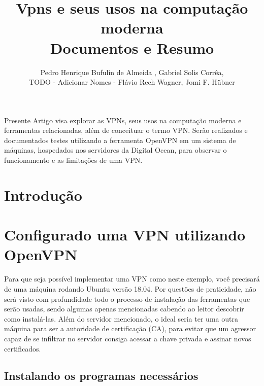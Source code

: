 \documentclass[12pt]{article}
\title{Vpns e seus usos na computação moderna\\ Documentos e Resumo}
\author{Pedro Henrique Bufulin de Almeida \inst{1}, Gabriel Solis Corrêa\inst{2},\\ TODO - Adicionar Nomes - Flávio Rech
  Wagner\inst{1}, Jomi F. Hübner\inst{3} }
\begin{document}
 

\maketitle
     
\begin{resumo} 
  Presente Artigo visa explorar as VPNs, seus usos na computação moderna
  e ferramentas relacionadas, além de conceituar o termo VPN. Serão realizados
  e documentados testes utilizando a ferramenta OpenVPN em um sistema de máquinas,
  hospedados nos servidores da Digital Ocean, para observar o funcionamento e as
  limitações de uma VPN.
\end{resumo}

\section{Introdução}



\section{Configurado uma VPN utilizando OpenVPN}

Para que seja possível implementar uma VPN como neste exemplo, você precisará
de uma máquina rodando Ubuntu versão 18.04. Por questões de praticidade, não será
visto com profundidade todo o processo de instalação das ferramentas que serão usadas, sendo algumas 
apenas mencionadas cabendo ao leitor descobrir como instalá-las. Além do servidor mencionado,
o ideal seria ter uma outra máquina para ser a autoridade de certificação (CA), para evitar
que um agressor capaz de se infiltrar no servidor consiga acessar a chave privada
e assinar novos certificados. 

\subsection{Instalando os programas necessários}
\end{document}
